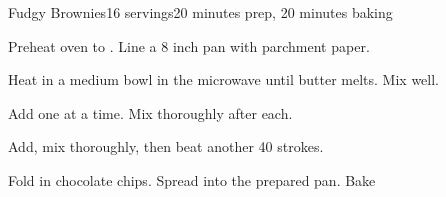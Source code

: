 \documentclass[../Cookbook.tex]{subfiles}
\begin{document}
\begin{recipe}{Fudgy Brownies}{16 servings}{20 minutes prep, 20 minutes baking}

Preheat oven to . Line a 8 inch pan with parchment paper.

Heat in a medium bowl in the microwave until butter melts. Mix well.

Add one at a time. Mix thoroughly after each.

Add, mix thoroughly, then beat another 40 strokes.

Fold in chocolate chips. Spread into the prepared pan. Bake 

\end{recipe}
\end{document}
